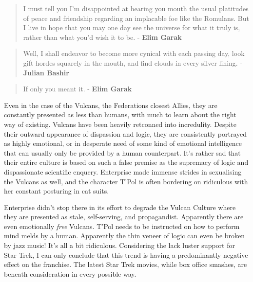 \clearpage

\begin{quote}
I must tell you I'm disappointed at hearing you mouth the usual platitudes of peace and friendship regarding an implacable foe like the Romulans. But I live in hope that you may one day see the universe for what it truly is, rather than what you'd wish it to be. - \textbf{Elim Garak}
\end{quote}

\begin{quote}
Well, I shall endeavor to become more cynical with each passing day, look gift hordes squarely in the mouth, and find clouds in every silver lining. - \textbf{Julian Bashir}
\end{quote}

\begin{quote}
If only you meant it. - \textbf{Elim Garak}
\end{quote}

Even in the case of the Vulcans, the Federations closest Allies, they are constantly presented as less than humans, with much to learn about the right way of existing. Vulcans have been heavily retconned into incredulity. Despite their outward appearance of dispassion and logic, they are consistently portrayed as highly emotional, or in desperate need of some kind of emotional intelligence that can usually only be provided by a human counterpart. It's rather sad that their entire culture is based on such a false premise as the supremacy of logic and dispassionate scientific enquery. Enterprise made immense strides in sexualising the Vulcans as well, and the character T'Pol is often bordering on ridiculous with her constant posturing in cat suits. 

Enterprise didn't stop there in its effort to degrade the Vulcan Culture where they are presented as stale, self-serving, and propagandist. Apparently there are even emotionally \textit{free} Vulcans. T'Pol needs to be instructed on how to perform mind melds by a human. Apparently the thin veneer of logic can even be broken by jazz music! It's all a bit ridiculous. Considering the lack luster support for Star Trek, I can only conclude that this trend is having a predominantly negative effect on the franchise. The latest Star Trek movies, while box office smashes, are beneath consideration in every possible way.

